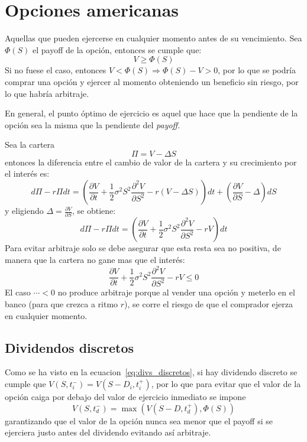 
\section{Opciones americanas}

Aquellas que pueden ejercerse en cualquier momento antes de su vencimiento. Sea $\Phi(S)$ el payoff de la opción, entonces se cumple que:
\[
\boxed{V \geq \Phi(S)}
\]\label{eq:cond_op_americana}
Si no fuese el caso, entonces $V < \Phi(S) \Rightarrow \Phi(S) - V > 0$, por lo que se podría comprar una opción y ejercer al momento obteniendo un beneficio sin riesgo, por lo que habría arbitraje.

En general, el punto óptimo de ejercicio es aquel que hace que la pendiente de la opción sea la misma que la pendiente del \textit{payoff}.

Sea la cartera
\[
\Pi = V - \Delta S
\]
entonces la diferencia entre el cambio de valor de la cartera y su crecimiento por el interés es:
\[
d\Pi - r\Pi dt = \left( \frac{\partial V}{\partial t} + \frac{1}{2} \sigma^2 S^2 \frac{\partial^2 V}{\partial S^2} - r(V - \Delta S) \right) dt + \left( \frac{\partial V}{\partial S} - \Delta \right) dS
\]
y eligiendo $\Delta = \frac{\partial V}{\partial S}$, se obtiene:
\[
d\Pi - r\Pi dt = \left( \frac{\partial V}{\partial t} + \frac{1}{2} \sigma^2 S^2 \frac{\partial^2 V}{\partial S^2} - rV \right) dt
\]
Para evitar arbitraje solo se debe asegurar que esta resta sea no positiva, de manera que la cartera no gane mas que el interés:
\[
\boxed{\frac{\partial V}{\partial t} + \frac{1}{2} \sigma^2 S^2 \frac{\partial^2 V}{\partial S^2} - rV \leq 0}
\]
El caso $\cdots < 0$ no produce arbitraje porque al vender una opción y meterlo en el banco (para que crezca a ritmo $r$), se corre el riesgo de que el comprador ejerza en cualquier momento.


\subsection{Dividendos discretos}
Como se ha visto en la ecuacion~\eqref{eq:divs_discretos}, si hay dividendo discreto se cumple que $V(S, t_i^-) = V(S - D_i, t_i^+)$, por lo que para evitar que el valor de la opción caiga por debajo del valor de ejercicio inmediato se impone
\[
\boxed{V(S, t_d^-) = \max\left(V(S - D, t_d^+), \Phi(S)\right)}
\]
garantizando que el valor de la opción nunca sea menor que el payoff si se ejerciera justo antes del dividendo evitando así arbitraje.





